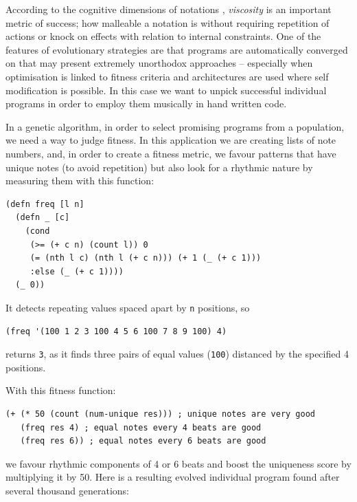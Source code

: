 \documentclass[letterpaper, 12pt]{article}
\begin{document}


According to the cognitive dimensions of notations \citep{green1989cognitive}, \emph{viscosity} is an important metric of success; how malleable a notation is without requiring repetition of actions or knock on effects with relation to internal constraints. One of the features of evolutionary strategies are that programs are automatically converged on that may present extremely unorthodox approaches -- especially when optimisation is linked to fitness criteria and architectures are used where self modification is possible. In this case we want to unpick successful individual programs in order to employ them musically in hand written code.

In a genetic algorithm, in order to select promising programs from a population, we need a way to judge fitness. In this application we are creating lists of note numbers, and, in order to create a fitness metric, we favour patterns that have unique notes (to avoid repetition) but also look for a rhythmic nature by measuring them with this function:

\begin{Verbatim}[fontfamily=courier, xleftmargin=\parindent]
(defn freq [l n]
  (defn _ [c]
    (cond
     (>= (+ c n) (count l)) 0
     (= (nth l c) (nth l (+ c n))) (+ 1 (_ (+ c 1)))
     :else (_ (+ c 1))))
  (_ 0))
\end{Verbatim}

It detects repeating values spaced apart by \texttt{n} positions, so
\begin{Verbatim}[fontfamily=courier, xleftmargin=\parindent]
(freq '(100 1 2 3 100 4 5 6 100 7 8 9 100) 4)
\end{Verbatim}
returns \texttt{3}, as it finds three pairs of equal values (\texttt{100}) distanced by the specified 4 positions.

With this fitness function:
\begin{Verbatim}[fontfamily=courier, xleftmargin=\parindent]
(+ (* 50 (count (num-unique res))) ; unique notes are very good
   (freq res 4) ; equal notes every 4 beats are good
   (freq res 6)) ; equal notes every 6 beats are good
\end{Verbatim}
we favour rhythmic components of 4 or 6 beats and boost the uniqueness score by multiplying it by 50. Here is a resulting evolved individual program found after several thousand generations:
\end{document}
